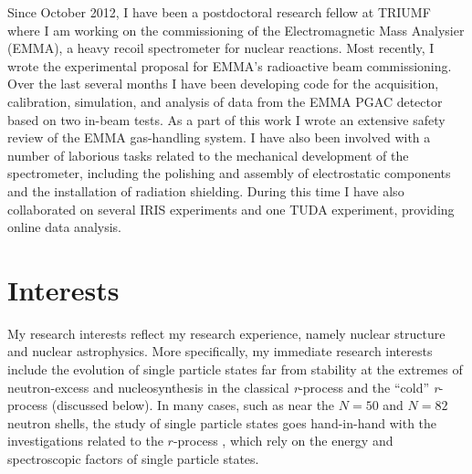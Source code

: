 Since October 2012,
I have been a postdoctoral research fellow at TRIUMF where I am working
on the commissioning of the Electromagnetic Mass Analysier (EMMA), a heavy recoil spectrometer for nuclear reactions. %
Most recently, I wrote the experimental proposal for EMMA's radioactive beam commissioning. Over the last several months I have been developing code for the acquisition, calibration, simulation, and analysis of data from the EMMA PGAC detector based on two in-beam tests. As a part of this work I wrote an extensive safety review of the EMMA gas-handling system. I have also been involved with a number of laborious tasks related to the mechanical development of the spectrometer, including the polishing and assembly of  electrostatic components and the installation of radiation shielding.
		During this time I have also collaborated on several IRIS experiments and one TUDA experiment, providing online data analysis.

\section*{Interests}
My research interests reflect my research experience, namely nuclear structure and nuclear astrophysics.  More specifically, my immediate 
research interests include %
 the evolution of single particle states far from stability at the extremes of neutron-excess and nucleosynthesis in the classical \textit{r}-process and the ``cold'' \textit{r}-process (discussed below). In many cases, such as near the $N=50$ and $N=82$ neutron shells, the study of single particle states goes hand-in-hand with the investigations related to the $r$-process%
, which rely on the energy and spectroscopic factors of single particle states.

